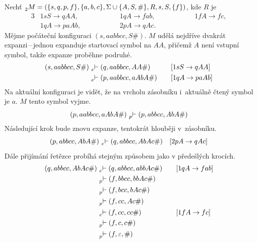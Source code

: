 \begin{example}\label{example_rza}
    Nechť $\prescript{}{2}{M} = (\{s, q, p, f\}, \{a, b, c\}, \Sigma \cup \{A, S, \#\}, R, s, S, \{f\})$, kde $R$ je
    \begin{alignat*}{3}
        & 1sS \rightarrow qAA, \qquad \qquad && 1qA \rightarrow fab, \qquad \qquad && 1fA \rightarrow fc, \\
        & 1qA \rightarrow paAb, \qquad \qquad && 2pA \rightarrow qAc. \qquad \qquad &&
    \end{alignat*}
    Mějme počáteční konfiguraci $(s, aabbcc, S\#)$.
    $M$ udělá nejdříve dvakrát expanzi\,--\,jednou expanduje startovací symbol na $AA$, přičemž $A$ není vstupní symbol, takže expanze proběhne podruhé.
    \begin{alignat*}{2}
        (s, aabbcc, S\#)\, &\prescript{}{e}{\vdash}\; (q, aabbcc, AA\#) \quad && [1sS \rightarrow qAA] \\
                           &\prescript{}{e}{\vdash}\; (p, aabbcc, aAbA\#) \quad && [1qA \rightarrow paAb] \\
    \end{alignat*}
    Na aktuální konfiguraci je vidět, že na vrcholu zásobníku i~aktuálně čtený symbol je $a$.
    $M$ tento symbol vyjme.
    \begin{equation*}
        (p, aabbcc, aAbA\#)\, \prescript{}{p}{\vdash}\; (p, abbcc, AbA\#)
    \end{equation*}
    Následující krok bude znovu expanze, tentokrát hlouběji v~zásobníku.
    \begin{equation*}
        (p, abbcc, AbA\#)\, \prescript{}{e}{\vdash}\; (q, abbcc, AbAc\#) \quad [2pA \rightarrow qAc]
    \end{equation*}
    Dále přijímání řetězce probíhá stejným způsobem jako v předešlých krocích.
    \begin{alignat*}{2}
        (q, abbcc, AbAc\#)\, &\prescript{}{e}{\vdash}\; (q, abbcc, abbAc\#) \quad && [1qA \rightarrow fab] \\
                             &\prescript{}{p}{\vdash}\; (f, bbcc, bbAc\#) \quad && \\
                             &\prescript{}{p}{\vdash}\; (f, bcc, bAc\#) \quad && \\
                             &\prescript{}{p}{\vdash}\; (f, cc, Ac\#) \quad && \\
                             &\prescript{}{e}{\vdash}\; (f, cc, cc\#) \quad && [1fA \rightarrow fc] \\ 
                             &\prescript{}{p}{\vdash}\; (f, c, c\#) \quad && \\
                             &\prescript{}{p}{\vdash}\; (f, \varepsilon, \#) \quad &&
    \end{alignat*}
\end{example}

